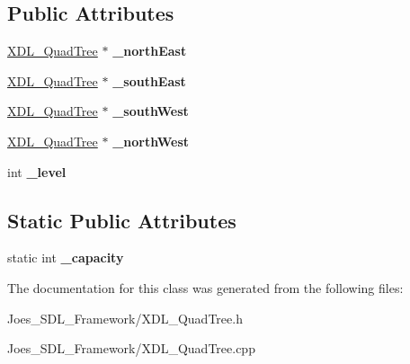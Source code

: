 \subsection*{Public Attributes}
\begin{DoxyCompactItemize}
\item 
\hypertarget{class_x_d_l___quad_tree_acc85ae42db4be16dd9e8568a850f4e2d}{\hyperlink{class_x_d_l___quad_tree}{X\-D\-L\-\_\-\-Quad\-Tree} $\ast$ {\bfseries \-\_\-north\-East}}\label{class_x_d_l___quad_tree_acc85ae42db4be16dd9e8568a850f4e2d}

\item 
\hypertarget{class_x_d_l___quad_tree_a71ff956263cd803c082eb70ee96d5523}{\hyperlink{class_x_d_l___quad_tree}{X\-D\-L\-\_\-\-Quad\-Tree} $\ast$ {\bfseries \-\_\-south\-East}}\label{class_x_d_l___quad_tree_a71ff956263cd803c082eb70ee96d5523}

\item 
\hypertarget{class_x_d_l___quad_tree_a7a094e71bd29cd975d5c49f73c5f2e29}{\hyperlink{class_x_d_l___quad_tree}{X\-D\-L\-\_\-\-Quad\-Tree} $\ast$ {\bfseries \-\_\-south\-West}}\label{class_x_d_l___quad_tree_a7a094e71bd29cd975d5c49f73c5f2e29}

\item 
\hypertarget{class_x_d_l___quad_tree_a98e6c81545e88aaf2ff0f1056310d2de}{\hyperlink{class_x_d_l___quad_tree}{X\-D\-L\-\_\-\-Quad\-Tree} $\ast$ {\bfseries \-\_\-north\-West}}\label{class_x_d_l___quad_tree_a98e6c81545e88aaf2ff0f1056310d2de}

\item 
\hypertarget{class_x_d_l___quad_tree_a31a7b81ec561677d23340aea5edef801}{int {\bfseries \-\_\-level}}\label{class_x_d_l___quad_tree_a31a7b81ec561677d23340aea5edef801}

\end{DoxyCompactItemize}
\subsection*{Static Public Attributes}
\begin{DoxyCompactItemize}
\item 
\hypertarget{class_x_d_l___quad_tree_abcce57fdae7b2b65f84c9a0c318cf6ec}{static int {\bfseries \-\_\-capacity}}\label{class_x_d_l___quad_tree_abcce57fdae7b2b65f84c9a0c318cf6ec}

\end{DoxyCompactItemize}


The documentation for this class was generated from the following files\-:\begin{DoxyCompactItemize}
\item 
Joes\-\_\-\-S\-D\-L\-\_\-\-Framework/X\-D\-L\-\_\-\-Quad\-Tree.\-h\item 
Joes\-\_\-\-S\-D\-L\-\_\-\-Framework/X\-D\-L\-\_\-\-Quad\-Tree.\-cpp\end{DoxyCompactItemize}
